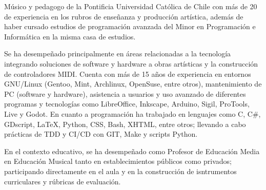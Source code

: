 

\begin{cvparagraph}

Músico y pedagogo de la Pontificia Universidad Católica de Chile con más de 20
de experiencia en los rubros de enseñanza y producción artística, además de
haber cursado estudios de programación avanzada del Minor en Programación e
Informática en la misma casa de estudios.

Se ha desempeñado principalmente en áreas relacionadas a la tecnología
integrando soluciones de software y hardware a obras artísticas y la
construcción de controladores MIDI. Cuenta con más de 15 años de experiencia en
entornos GNU/Linux (Gentoo, Mint, Archlinux, OpenSuse, entre otros),
mantenimiento de PC (software y hardware), asistencia a usuarios y uso avanzado
de diferentes programas y tecnologías como LibreOffice, Inkscape, Arduino,
Sigil, ProTools, Live y Godot. En cuanto a programación ha trabajado en
lenguajes como C, C\#, GDscript, LaTeX, Python, CSS, Bash, XHTML, entre otros;
llevando a cabo prácticas de TDD y CI/CD con GIT, Make y scripts Python.

En el contexto educativo, se ha desempeñado como Profesor de Educación Media en
Educación Musical tanto en establecimientos públicos como privados;
participando directamente en el aula y en la construcción de isntrumentos
curriculares y rúbricas de evaluación.

\end{cvparagraph}

